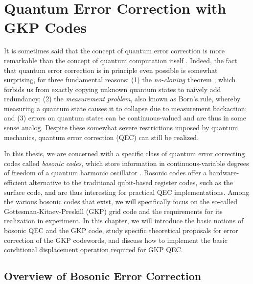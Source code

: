 \chapter{Quantum Error Correction with GKP Codes\label{ch:2_QEC}}

It is sometimes said that the concept of quantum error correction is more remarkable than the concept of quantum computation itself \cite{girvin2019QECvideo}. Indeed, the fact that quantum error correction is in principle even possible is somewhat surprising, for three fundamental reasons: (1) the \textit{no-cloning} theorem \cite{ike-and-mike}, which forbids us from exactly copying unknown quantum states to naively add redundancy; (2) the \textit{measurement problem}, also known as Born's rule, whereby measuring a quantum state causes it to collapse due to measurement backaction; and (3) errors on quantum states can be continuous-valued and are thus in some sense analog. Despite these somewhat severe restrictions imposed by quantum mechanics, quantum error correction (QEC) can still be realized. 


In this thesis, we are concerned with a specific class of quantum error correcting codes called \textit{bosonic codes}, which store information in continuous-variable degrees of freedom of a quantum harmonic oscillator \cite{terhal2020bosonic, cai2021bosonic, joshi2021bosonic}. Bosonic codes offer a hardware-efficient alternative to the traditional qubit-based register codes, such as the surface code, and are thus interesting for practical QEC implementations. Among the various bosonic codes that exist, we will specifically focus on the so-called Gottesman-Kitaev-Preskill (GKP) grid code and the requirements for its realization in experiment. In this chapter, we will introduce the basic notions of bosonic QEC and the GKP code, study specific theoretical proposals for error correction of the GKP codewords, and discuss how to implement the basic conditional displacement operation required for GKP QEC.

\section{Overview of Bosonic Error Correction}
